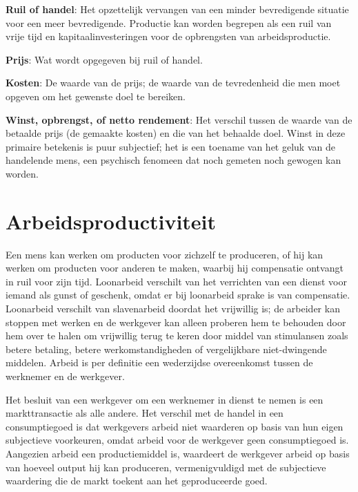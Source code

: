 \textbf{Ruil of handel}: Het opzettelijk vervangen van een minder
bevredigende situatie voor een meer bevredigende. Productie kan worden
begrepen als een ruil van vrije tijd en kapitaalinvesteringen voor de
opbrengsten van arbeidsproductie.

\textbf{Prijs}: Wat wordt opgegeven bij ruil of handel.

\textbf{Kosten}: De waarde van de prijs; de waarde van de tevredenheid
die men moet opgeven om het gewenste doel te bereiken.

\textbf{Winst, opbrengst, of netto rendement}: Het verschil tussen de
waarde van de betaalde prijs (de gemaakte kosten) en die van het
behaalde doel. Winst in deze primaire betekenis is puur subjectief; het
is een toename van het geluk van de handelende mens, een psychisch
fenomeen dat noch gemeten noch gewogen kan worden.


\section{Arbeidsproductiviteit}

Een mens kan werken om producten voor zichzelf te produceren, of hij kan
werken om producten voor anderen te maken, waarbij hij compensatie
ontvangt in ruil voor zijn tijd. Loonarbeid verschilt van het verrichten
van een dienst voor iemand als gunst of geschenk, omdat er bij
loonarbeid sprake is van compensatie. Loonarbeid verschilt van
slavenarbeid doordat het vrijwillig is; de arbeider kan stoppen met
werken en de werkgever kan alleen proberen hem te behouden door hem over
te halen om vrijwillig terug te keren door middel van stimulansen zoals
betere betaling, betere werkomstandigheden of vergelijkbare
niet-dwingende middelen. Arbeid is per definitie een wederzijdse
overeenkomst tussen de werknemer en de werkgever.

Het besluit van een werkgever om een werknemer in dienst te nemen is een
markttransactie als alle andere. Het verschil met de handel in een
consumptiegoed is dat werkgevers arbeid niet waarderen op basis van hun
eigen subjectieve voorkeuren, omdat arbeid voor de werkgever geen
consumptiegoed is. Aangezien arbeid een productiemiddel is, waardeert de
werkgever arbeid op basis van hoeveel output hij kan produceren,
vermenigvuldigd met de subjectieve waardering die de markt toekent aan
het geproduceerde goed.

